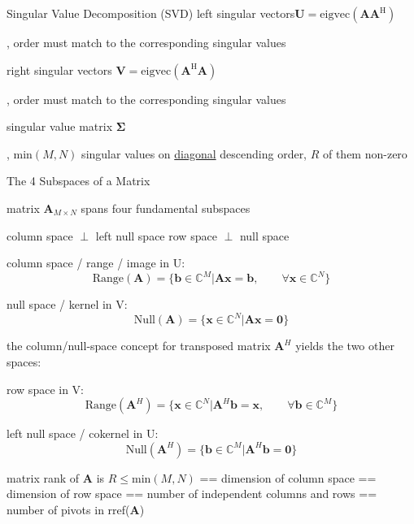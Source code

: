 \documentclass[mathserif, aspectratio=1610]{intbeamer}
\begin{document}
\begin{frame}{Singular Value Decomposition (SVD)}
left singular vectors\quad$\bm{U} = \mathrm{eigvec}(\bm{A}\bm{A}^\mathrm{H})$
\begin{footnotesize}, order must match to the corresponding singular values\end{footnotesize}

right singular vectors $\bm{V} = \mathrm{eigvec}(\bm{A}^\mathrm{H}\bm{A})$
\begin{footnotesize}, order must match to the corresponding singular values\end{footnotesize}

singular value matrix $\bm{\Sigma}$
\begin{footnotesize}, $\text{min}(M,N)$ singular values on \underline{diagonal} descending order, $R$ of them non-zero
\end{footnotesize}
\end{frame}






\begin{frame}{The 4 Subspaces of a Matrix}

matrix $\bm{A}_{M \times N}$ spans four fundamental subspaces

\hspace{4.25cm}
\textcolor{C0}{column space} $\perp$ \textcolor{C4}{left null space}
\hspace{0.75cm}
\textcolor{C2}{row space} $\perp$ \textcolor{C1}{null space}

\textcolor{C0}{column space / range / image in U:} $$\text{Range}(\bm{A}) = \{\bm{b}\in\mathbb{C}^M | \bm{A} \bm{x} = \bm{b},\qquad\forall \bm{x}\in\mathbb{C}^N\}$$

\textcolor{C1}{null space / kernel in V:} $$\text{Null}(\bm{A}) = \{\bm{x}\in\mathbb{C}^N | \bm{A} \bm{x} = \bm{0}\}$$

the column/null-space concept for transposed matrix $\bm{A}^H$ yields the two other spaces:

\textcolor{C2}{row space in V:} $$\text{Range}(\bm{A}^H) = \{\bm{x}\in\mathbb{C}^N | \bm{A}^H \bm{b} = \bm{x},\qquad\forall \bm{b}\in\mathbb{C}^M\}$$

\textcolor{C4}{left null space / cokernel in U:} $$\text{Null}(\bm{A}^H) = \{\bm{b}\in\mathbb{C}^M | \bm{A}^H \bm{b} = \bm{0}\}$$

matrix rank of $\bm{A}$ is $R\leq \text{min}(M,N)$ == dimension of column space == dimension of row space == number of independent columns and rows
== number of pivots in rref($\bm{A}$)

\end{frame}
\end{document}
